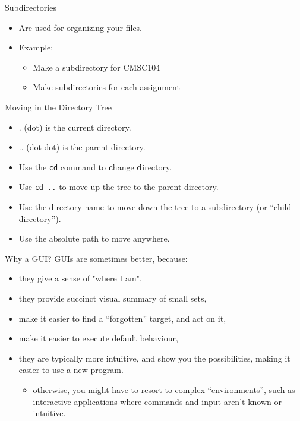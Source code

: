\documentclass[graphics]{beamer}
\begin{document}
\begin{frame}{Subdirectories}
    \begin{itemize}
        \item Are used for organizing your files.
        \item Example:
        \begin{itemize}
            \item Make a subdirectory for CMSC104
            \item Make subdirectories for each assignment
        \end{itemize}
    \end{itemize}
    \centering
    
\end{frame}

\begin{frame}{Moving in the Directory Tree}
    \begin{itemize}
        \item . (dot) is the current directory.
        \item .. (dot-dot) is the parent directory.
        \item Use the \texttt{cd} command to \textbf{c}hange \textbf{d}irectory.
        \item Use \texttt{cd ..} to move up the tree to the parent directory.
        \item Use the directory name to move down the tree to a subdirectory (or ``child directory'').
        \item Use the absolute path to move anywhere.
    \end{itemize}
\end{frame}

\begin{frame}{Why a GUI?}
    GUIs are sometimes better, because:
    \begin{itemize}
        \item they give a sense of "where I am",
        \item they provide succinct visual summary of small sets,
        \item make it easier to find a ``forgotten'' target, and act on it,
        \item make it easier to execute default behaviour,
        \item they are typically more intuitive, and show you the possibilities, making it easier to use a new program.
        \begin{itemize}
            \item otherwise, you might have to resort to complex ``environments'', such as interactive applications where commands and input aren't known or intuitive.
        \end{itemize}
    \end{itemize}
\end{frame}
\end{document}
